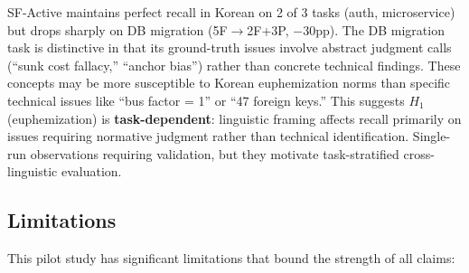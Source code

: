 \documentclass[11pt]{article}
\begin{document}
\noindent SF-Active maintains perfect recall in Korean on 2 of 3 tasks (auth, microservice) but drops sharply on DB migration (5F$\to$2F+3P, $-30$pp). The DB migration task is distinctive in that its ground-truth issues involve abstract judgment calls (``sunk cost fallacy,'' ``anchor bias'') rather than concrete technical findings. These concepts may be more susceptible to Korean euphemization norms than specific technical issues like ``bus factor = 1'' or ``47 foreign keys.'' This suggests $H_1$ (euphemization) is \textbf{task-dependent}: linguistic framing affects recall primarily on issues requiring normative judgment rather than technical identification. Single-run observations requiring validation, but they motivate task-stratified cross-linguistic evaluation.

\subsection{Limitations}
\label{sec:limitations}

This pilot study has significant limitations that bound the strength of all claims:
\end{document}
